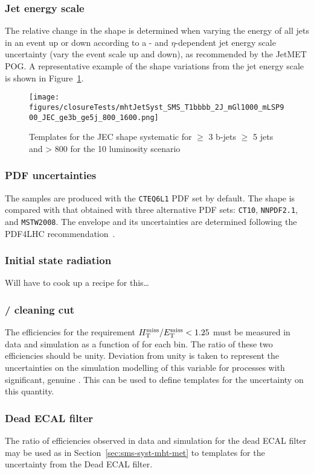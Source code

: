 \subsubsection{Jet energy scale\label{sec:sms-syst-jes}}
The relative change in the \mht shape is
determined when varying the energy of all jets in an event up or down
according to a \pt- and $\eta$-dependent jet energy scale uncertainty
(\ie vary the event scale up and down), as recommended by the JetMET
POG. A representative example of the shape variations from the jet energy scale 
is shown in Figure~\ref{fig:jec-shape}.

\begin{figure}[]
  \centering
  \texttt{[image: figures/closureTests/mhtJetSyst\_SMS\_T1bbbb\_2J\_mGl1000\_mLSP900\_JEC\_ge3b\_ge5j\_800\_1600.png]}
  \caption{\label{fig:jec-shape} Templates for the JEC shape systematic for $\geq$ 3 b-jets $\geq$ 5 jets and \scalht > 800 for the 10 \ifb luminosity scenario}
\end{figure}

\subsubsection{PDF uncertainties\label{sec:pdf-sets}}

\newcommand{\lcr}{Left: $\frac{\epsilon_{CTEQ6L1}}{\epsilon_{CT10}}$,
  center: $\frac{\epsilon_{CTEQ6L1}}{\epsilon_{MSTW08}}$, right:
  $\frac{\epsilon_{CTEQ6L1}}{\epsilon_{NNPDF2.1}}$}

The samples are produced with the \verb!CTEQ6L1! PDF set by
default. The shape is compared with that obtained with
three alternative PDF sets: \verb!CT10!, \verb!NNPDF2.1!, and
\verb!MSTW2008!. The envelope and its uncertainties are determined
following the PDF4LHC recommendation~\cite{pdf4lhc}.


\subsubsection{Initial state radiation\label{sec:sms-syst-isr}}
Will have to cook up a recipe for this\ldots


\subsubsection{\texorpdfstring{\mht/\met}{MHT/MET} cleaning cut\label{sec:sms-syst-mht-met}}
The efficiencies for the requirement $\mbox{$H_{\rm T}^{\rm miss}$}/\mbox{$E_\text{T}^{\rm miss}$} < 1.25$ must be measured in 
data and simulation as a function of \mht for each \scalht bin.
The ratio of these two efficiencies should be unity. Deviation from unity is taken
to represent the uncertainties on the simulation modelling of this
variable for processes with significant, genuine \met. This can be used
to define templates for the uncertainty on this quantity.

\subsubsection{Dead ECAL filter\label{sec:sms-syst-dead-ecal}}

The ratio of efficiencies observed in data and simulation for the dead
ECAL filter may be used as in Section~\ref{sec:sms-syst-mht-met} to templates
for the uncertainty from the Dead ECAL filter. 
